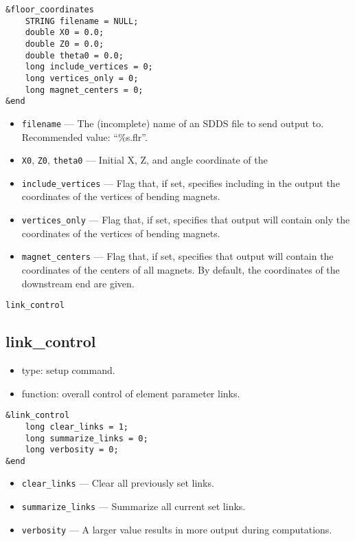 \documentclass[11pt]{article}
\begin{document}
\begin{verbatim}
&floor_coordinates
    STRING filename = NULL;
    double X0 = 0.0;
    double Z0 = 0.0;
    double theta0 = 0.0;
    long include_vertices = 0;
    long vertices_only = 0;
    long magnet_centers = 0;
&end
\end{verbatim}

\begin{itemize}
\item \verb|filename| --- The (incomplete) name of an SDDS file to send output to.  
 Recommended value: ``\%s.flr''.
\item \verb|X0|, \verb|Z0|, \verb|theta0| --- Initial X, Z, and angle coordinate of the
\item \verb|include_vertices| --- Flag that, if set, specifies including  in the output
the coordinates of the vertices of bending magnets.
\item \verb|vertices_only| --- Flag that, if set, specifies that output will contain only
the coordinates of the vertices of bending magnets.
\item \verb|magnet_centers| --- Flag that, if set, specifies that output will contain 
the coordinates of the centers of all magnets.  By default, the coordinates of the downstream
end are given.
\end{itemize}

\begin{latexonly}
\newpage
\begin{center}{\Large\verb|link_control|}\end{center}
\end{latexonly}
\subsection{link\_control}

\begin{itemize}
\item type: setup command.
\item function: overall control of element parameter links.
\end{itemize}

\begin{verbatim}
&link_control
    long clear_links = 1;
    long summarize_links = 0;
    long verbosity = 0;
&end
\end{verbatim}

\begin{itemize}
\item \verb|clear_links| --- Clear all previously set links.
\item \verb|summarize_links| --- Summarize all current set links.
\item \verb|verbosity| --- A larger value results in more output
during computations.

\end{itemize}
\end{document}
